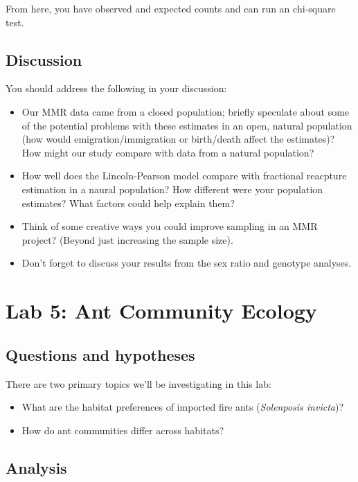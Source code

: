 \documentclass[]{book}
\providecommand{\tightlist}{%
  \setlength{\itemsep}{0pt}\setlength{\parskip}{0pt}}
\begin{document}
From here, you have observed and expected counts and can run an
chi-square test.

\section{Discussion}\label{discussion-2}

You should address the following in your discussion:

\begin{itemize}
\tightlist
\item
  Our MMR data came from a closed population; briefly speculate about
  some of the potential problems with these estimates in an open,
  natural population (how would emigration/immigration or birth/death
  affect the estimates)? How might our study compare with data from a
  natural population?
\item
  How well does the Lincoln-Pearson model compare with fractional
  reacpture estimation in a naural population? How different were your
  population estimates? What factors could help explain them?
\item
  Think of some creative ways you could improve sampling in an MMR
  project? (Beyond just increasing the sample size).\\
\item
  Don't forget to discuss your results from the sex ratio and genotype
  analyses.
\end{itemize}

\chapter{Lab 5: Ant Community Ecology}\label{Lab5}

\section{Questions and hypotheses}\label{questions-and-hypotheses-2}

There are two primary topics we'll be investigating in this lab:

\begin{itemize}
\tightlist
\item
  What are the habitat preferences of imported fire ants
  (\emph{Solenposis invicta})?
\item
  How do ant communities differ across habitats?
\end{itemize}

\section{Analysis}\label{analysis-2}
\end{document}
